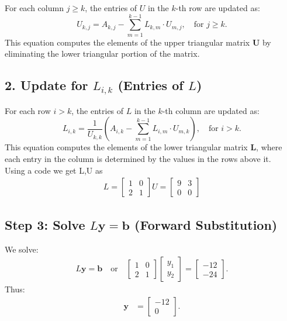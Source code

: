 \documentclass[journal]{IEEEtran}
\numberwithin{equation}{enumi}
\numberwithin{figure}{enumi}
\begin{document}
\begin{enumerate}
For each column $ j \geq k $, the entries of $ U $ in the $ k $-th row are updated as:
\[
U_{k,j} = A_{k,j} - \sum_{m=1}^{k-1} L_{k,m} \cdot U_{m,j}, \quad \text{for } j \geq k.
\]
This equation computes the elements of the upper triangular matrix $ \mathbf{U} $ by eliminating the lower triangular portion of the matrix.

\subsection*{2. Update for $ L_{i,k} $ (Entries of $ L $)}

For each row $ i > k $, the entries of $ L $ in the $ k $-th column are updated as:
\[
L_{i,k} = \frac{1}{U_{k,k}} \left( A_{i,k} - \sum_{m=1}^{k-1} L_{i,m} \cdot U_{m,k} \right), \quad \text{for } i > k.
\]
This equation computes the elements of the lower triangular matrix $ \mathbf{L} $, where each entry in the column is determined by the values in the rows above it.\\
Using a code we get L,U as 
\begin{align}
    L=\begin{bmatrix} 1 & 0 \\ 2 & 1 \end{bmatrix}
    U=\begin{bmatrix} 9 & 3 \\ 0 & 0 \end{bmatrix}
\end{align}

	\subsection*{Step 3: Solve $L\mathbf{y} = \mathbf{b}$ (Forward Substitution)}
	We solve:
	\begin{align}
		L\mathbf{y} = \mathbf{b} \quad \text{or} \quad \begin{bmatrix} 1 & 0 \\ 2 & 1 \end{bmatrix} \begin{bmatrix} y_1 \\ y_2 \end{bmatrix} = \begin{bmatrix} -12 \\ -24 \end{bmatrix}.
	\end{align}
	Thus:
	\begin{align}
		\mathbf{y} &= \begin{bmatrix} -12 \\ 0 \end{bmatrix}.
	\end{align}
	

\end{enumerate}
\end{document}
